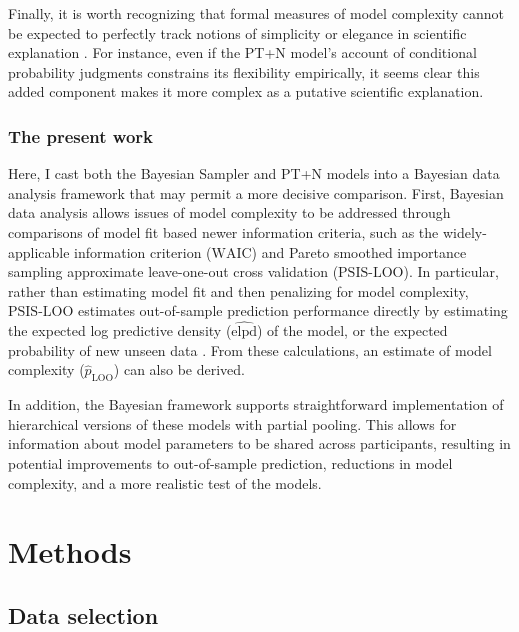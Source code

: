 \documentclass[
  man,floatsintext]{apa6}
\begin{document}
Finally, it is worth recognizing that formal measures of model complexity cannot be expected to perfectly track notions of simplicity or elegance in scientific explanation \autocites[for some related discussions, see][]{kuhn1977,sober2002,piantadosi2018}. For instance, even if the PT+N model's account of conditional probability judgments constrains its flexibility empirically, it seems clear this added component makes it more complex as a putative scientific explanation.

\hypertarget{the-present-work}{%
\subsubsection{The present work}\label{the-present-work}}

Here, I cast both the Bayesian Sampler and PT+N models into a Bayesian data analysis framework that may permit a more decisive comparison. First, Bayesian data analysis allows issues of model complexity to be addressed through comparisons of model fit based newer information criteria, such as the widely-applicable information criterion (\({\text{WAIC}}\)) and Pareto smoothed importance sampling approximate leave-one-out cross validation (\(\text{PSIS-LOO}\)). In particular, rather than estimating model fit and then penalizing for model complexity, \(\text{PSIS-LOO}\) estimates out-of-sample prediction performance directly by estimating the expected log predictive density (\(\widehat{\text{elpd}}\)) of the model, or the expected probability of new unseen data \autocite{gelman.etal2014,vehtari.etal2017}. From these calculations, an estimate of model complexity (\(\hat{p}_{\text{LOO}}\)) can also be derived.

In addition, the Bayesian framework supports straightforward implementation of hierarchical versions of these models with partial pooling. This allows for information about model parameters to be shared across participants, resulting in potential improvements to out-of-sample prediction, reductions in model complexity, and a more realistic test of the models.

\hypertarget{methods}{%
\section{Methods}\label{methods}}

\hypertarget{data-selection}{%
\subsection{Data selection}\label{data-selection}}
\end{document}
